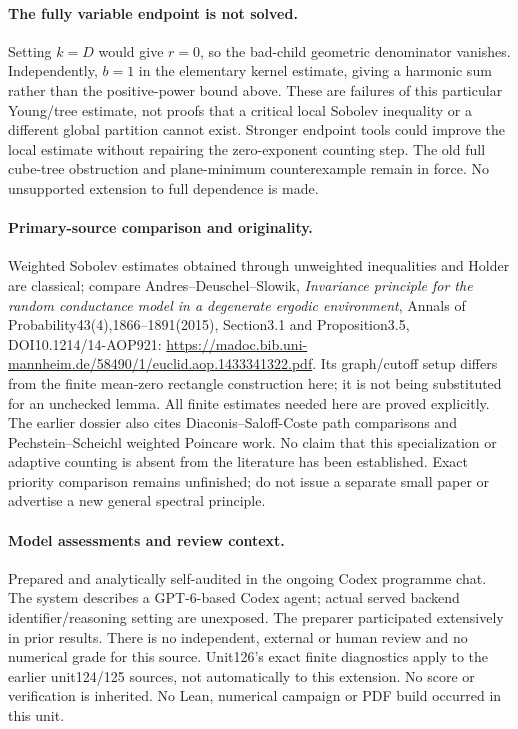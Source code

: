 \documentclass[11pt]{article}
\begin{document}
\paragraph{The fully variable endpoint is not solved.}
Setting $k=D$ would give $r=0$, so the bad-child geometric denominator vanishes. Independently, $b=1$ in the elementary kernel estimate, giving a harmonic sum rather than the positive-power bound above. These are failures of this particular Young/tree estimate, not proofs that a critical local Sobolev inequality or a different global partition cannot exist. Stronger endpoint tools could improve the local estimate without repairing the zero-exponent counting step. The old full cube-tree obstruction and plane-minimum counterexample remain in force. No unsupported extension to full dependence is made.

\paragraph{Primary-source comparison and originality.}
Weighted Sobolev estimates obtained through unweighted inequalities and Holder are classical; compare Andres--Deuschel--Slowik, \emph{Invariance principle for the random conductance model in a degenerate ergodic environment}, Annals of Probability43(4),1866--1891(2015), Section3.1 and Proposition3.5, DOI10.1214/14-AOP921:
\url{https://madoc.bib.uni-mannheim.de/58490/1/euclid.aop.1433341322.pdf}.
Its graph/cutoff setup differs from the finite mean-zero rectangle construction here; it is not being substituted for an unchecked lemma. All finite estimates needed here are proved explicitly. The earlier dossier also cites Diaconis--Saloff-Coste path comparisons and Pechstein--Scheichl weighted Poincare work. No claim that this specialization or adaptive counting is absent from the literature has been established. Exact priority comparison remains unfinished; do not issue a separate small paper or advertise a new general spectral principle.

\paragraph{Model assessments and review context.}
Prepared and analytically self-audited in the ongoing Codex programme chat. The system describes a GPT-6-based Codex agent; actual served backend identifier/reasoning setting are unexposed. The preparer participated extensively in prior results. There is no independent, external or human review and no numerical grade for this source. Unit126's exact finite diagnostics apply to the earlier unit124/125 sources, not automatically to this extension. No score or verification is inherited. No Lean, numerical campaign or PDF build occurred in this unit.
\end{document}

